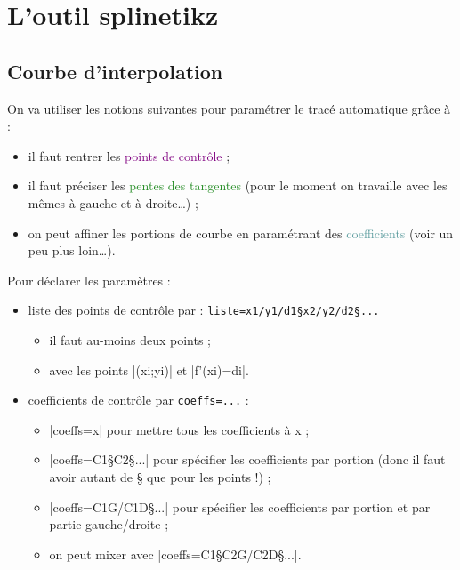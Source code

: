 \documentclass{article}
\newcommand\ctex[1]{\tcbox[vignettelatex]{#1}}
\begin{document}
\newpage

\section{L'outil \og splinetikz \fg}

\subsection{Courbe d'interpolation}

\begin{codeinfo}
On va utiliser les notions suivantes pour paramétrer le tracé \og automatique \fg{} grâce à  \ctex{..controls} :
%
\begin{itemize}
	\item il faut rentrer les \textcolor{purple}{\textsf{points de contrôle}} ;
	\item il faut préciser les \textcolor{ForestGreen}{\textsf{pentes des tangentes}} (pour le moment on travaille avec les mêmes à gauche et à droite\ldots) ;
	\item on peut \og affiner \fg{} les portions de courbe en paramétrant des \textcolor{CadetBlue}{\textsf{coefficients}} (voir un peu plus loin\ldots).
\end{itemize}

\medskip

Pour déclarer les paramètres :
%
\begin{itemize}
	\item liste des points de contrôle par : \verb|liste=x1/y1/d1§x2/y2/d2§...|
	\begin{itemize}
		\item il faut au-moins deux points ;
		\item avec les points \pverb|(xi;yi)| et \vverb|f'(xi)=di|.
	\end{itemize}
	\item coefficients de contrôle par \verb|coeffs=...| :
	\begin{itemize}
		\item \averb|coeffs=x| pour mettre tous les coefficients à x ;
		\item \averb|coeffs=C1§C2§...| pour spécifier les coefficients par portion (donc il faut avoir autant de § que pour les points !) ;
		\item \averb|coeffs=C1G/C1D§...| pour spécifier les coefficients par portion et par partie gauche/droite ;
		\item on peut mixer avec \averb|coeffs=C1§C2G/C2D§...|.
	\end{itemize}
\end{itemize}
\end{codeinfo}
\end{document}
